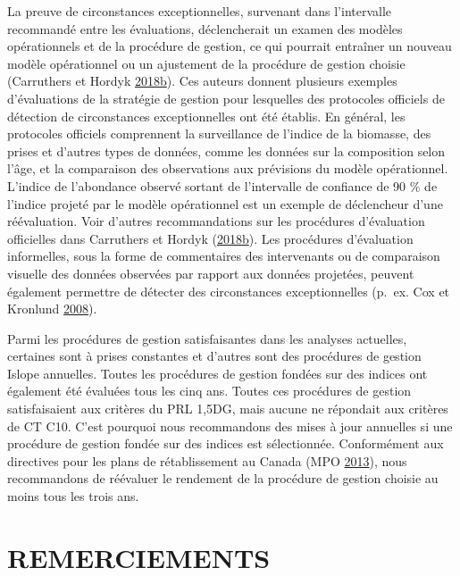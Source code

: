 \documentclass[french,11pt]{book}
\begin{document}
La preuve de circonstances exceptionnelles, survenant dans l'intervalle recommandé entre les évaluations, déclencherait un examen des modèles opérationnels et de la procédure de gestion, ce qui pourrait entraîner un nouveau modèle opérationnel ou un ajustement de la procédure de gestion choisie (Carruthers et Hordyk \protect\hyperlink{ref-carruthers_hordyk_2018}{2018}\protect\hyperlink{ref-carruthers_hordyk_2018}{b}). Ces auteurs donnent plusieurs exemples d'évaluations de la stratégie de gestion pour lesquelles des protocoles officiels de détection de circonstances exceptionnelles ont été établis. En général, les protocoles officiels comprennent la surveillance de l'indice de la biomasse, des prises et d'autres types de données, comme les données sur la composition selon l'âge, et la comparaison des observations aux prévisions du modèle opérationnel. L'indice de l'abondance observé sortant de l'intervalle de confiance de 90 \% de l'indice projeté par le modèle opérationnel est un exemple de déclencheur d'une réévaluation. Voir d'autres recommandations sur les procédures d'évaluation officielles dans Carruthers et Hordyk (\protect\hyperlink{ref-carruthers_hordyk_2018}{2018}\protect\hyperlink{ref-carruthers_hordyk_2018}{b}). Les procédures d'évaluation informelles, sous la forme de commentaires des intervenants ou de comparaison visuelle des données observées par rapport aux données projetées, peuvent également permettre de détecter des circonstances exceptionnelles (p.~ex. Cox et Kronlund \protect\hyperlink{ref-cox2008a}{2008}).

Parmi les procédures de gestion satisfaisantes dans les analyses actuelles, certaines sont à prises constantes et d'autres sont des procédures de gestion Islope annuelles. Toutes les procédures de gestion fondées sur des indices ont également été évaluées tous les cinq ans. Toutes ces procédures de gestion satisfaisaient aux critères du PRL 1,5DG, mais aucune ne répondait aux critères de CT C10. C'est pourquoi nous recommandons des mises à jour annuelles si une procédure de gestion fondée sur des indices est sélectionnée. Conformément aux directives pour les plans de rétablissement au Canada (MPO \protect\hyperlink{ref-dfo2013}{2013}), nous recommandons de réévaluer le rendement de la procédure de gestion choisie au moins tous les trois ans.

\clearpage

\hypertarget{remerciements}{%
\section{REMERCIEMENTS}\label{remerciements}}
\end{document}
